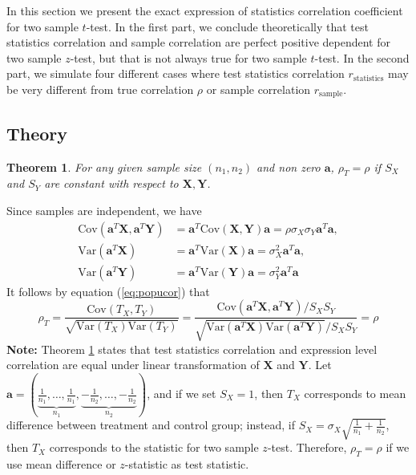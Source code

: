 \documentclass[12pt, a4paper]{article}
\newtheorem{theorem}{Theorem}       %
\newcommand{\cov}{\text{Cov}}
\newcommand{\var}{\text{Var}}
\begin{document}
	In this section we present the exact expression of statistics correlation coefficient for two
	sample $t$-test. In the first part, we conclude theoretically that test statistics correlation and
	sample correlation are perfect positive dependent for two sample $z$-test, but that is not always
	true for two sample $t$-test. In the second part, we simulate four different cases where test
	statistics correlation $r_{\text{statistics}}$ may be very different from true correlation $\rho$ or
	sample correlation $r_{\text{sample}}$. 
	\subsection{Theory}
	\begin{theorem}\label{thm:lineartransformation} 
		For any given sample size $(n_1, n_2)$ and non zero $\bm a$, $\rho_T=\rho$ if $S_X$ and $S_Y$ are constant with respect to $\bm X, \bm Y$. 
	\end{theorem}
	 Since samples are independent, we have 
	\begin{equation}
	\begin{aligned}
		\cov(\bm a^T\bm X, \bm a^T\bm Y) &= \bm a^T \cov(\bm X, \bm Y)\bm a  = \rho\sigma_X\sigma_Y\bm a^T\bm a, \\
		\var(\bm a^T\bm X)& = \bm a^T\var(\bm X)\bm a   = \sigma_X^2\bm a^T\bm a, \\
		\var(\bm a^T\bm Y)& = \bm a^T\var(\bm Y)\bm a   = \sigma_Y^2\bm a^T\bm a 
	\end{aligned}
	\end{equation}
	It follows by equation (\ref{eq:popucor}) that
	\begin{equation}
	\rho_T = \dfrac{\cov(T_X, T_Y)}{\sqrt{\var(T_X)\var(T_Y)}} = \dfrac{\cov(\bm a^T\bm X, \bm a^T\bm Y)/S_XS_Y}{\sqrt{\var(\bm a^T\bm X)\var(\bm a^T\bm Y)}/S_XS_Y} = \rho
	\end{equation}
	\textbf{Note:} Theorem \ref{thm:lineartransformation} states that test statistics correlation and expression level correlation are equal under linear transformation of $\bm X$ and $\bm Y$. Let $\bm a  = (\underbrace{\frac{1}{n_1}, \ldots, \frac{1}{n_1}}_{n_1}, \underbrace{-\frac{1}{n_2}, \ldots, -\frac{1}{n_2}}_{n_2})$, and if we set $S_X=1$, then $T_X$ corresponds to mean difference between treatment and control group; instead, if $S_X = \sigma_X\sqrt{\frac{1}{n_1} + \frac{1}{n_2}}$, then $T_X$ corresponds to the statistic for two sample $z$-test. Therefore, $\rho_T=\rho$ if we use mean difference or $z$-statistic as test statistic.
	
\end{document}
